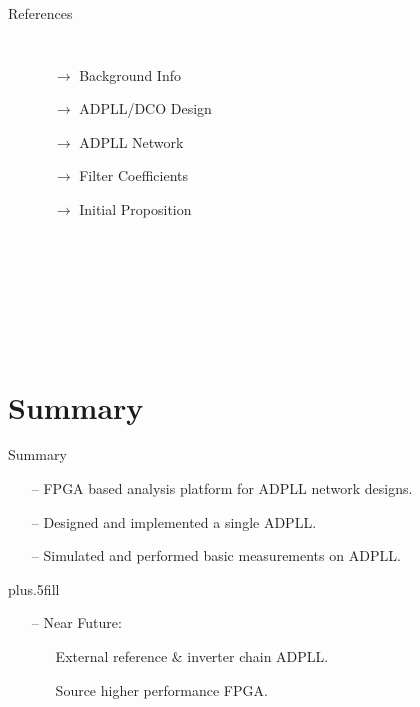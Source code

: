 \documentclass{beamer}
\begin{document}
\begin{frame}{References}
\begin{columns}
\begin{thebibliography}{10}
\begin{tiny}
	    \end{tiny}
        
	  	\end{thebibliography}
  		\begin{itemize}
  			\vspace{5mm}
  			\item[$\rightarrow$] Background Info
                \vspace{0.8 cm}
  			\item[$\rightarrow$] ADPLL/DCO Design
  			\vspace{0.6 cm}
  			\item[$\rightarrow$] ADPLL Network
  			\vspace{0.6 cm}
  			\item[$\rightarrow$] Filter Coefficients
            \vspace{0.6 cm}
            \item[$\rightarrow$] Initial Proposition
            \item[] ~
  			\item[] ~
            \item[] ~
  		\end{itemize}
  \end{columns}
\end{frame}

\section*{Summary}

\begin{frame}{Summary}

    \begin{itemize}
        \item[--]
            FPGA based analysis platform for ADPLL network designs.
        \item[--]
            Designed and implemented a single ADPLL.
        \item[--]
            Simulated and performed basic measurements on ADPLL.
    \end{itemize}

    \vskip0pt plus.5fill
    \begin{itemize}
        \item[--]
        Near Future:
        \begin{itemize}
            \item[]
                External reference \& inverter chain ADPLL.
            \item[]
                Source higher performance FPGA.
    \end{itemize}
  \end{itemize}
\end{frame}
\end{document}

